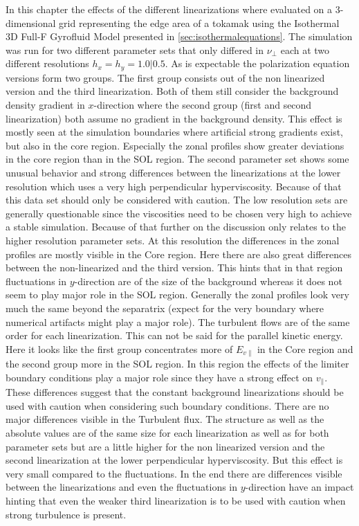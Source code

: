 \documentclass[master.tex]{subfiles}
\begin{document}
In this chapter the effects of the different linearizations where evaluated on a 3-dimensional grid representing the edge area of a tokamak using the Isothermal 3D Full-F Gyrofluid Model presented in \autoref{sec:isothermalequations}. The simulation was run for two different parameter sets that only differed in $\nu_\perp$ each at two different resolutions $h_x=h_y=1.0|0.5$.
As is expectable the polarization equation versions form two groups. The first group consists out of the non linearized version and the third linearization. Both of them still consider the background density gradient in $x$-direction where the second group (first and second linearization) both assume no gradient in the background density. This effect is mostly seen at the simulation boundaries where artificial strong gradients exist, but also in the core region. Especially the zonal profiles show greater deviations in the core region than in the SOL region.\newline
The second parameter set shows some unusual behavior and strong differences between the linearizations at the lower resolution which uses a very high perpendicular hyperviscosity. Because of that this data set should only be considered with caution.\newline
The low resolution sets are generally questionable since the viscosities need to be chosen very high to achieve a stable simulation. Because of that further on the discussion only relates to the higher resolution parameter sets.\newline
At this resolution the differences in the zonal profiles are mostly visible in the Core region. Here there are also great differences between the non-linearized and the third version. This hints that in that region fluctuations in $y$-direction are of the size of the background whereas it does not seem to play major role in the \ac{SOL} region. Generally the zonal profiles look very much the same beyond the separatrix (expect for the very boundary where numerical artifacts might play a major role). The turbulent flows are of the same order for each linearization. This can not be said for the parallel kinetic energy. Here it looks like the first group concentrates more of $E_{v\parallel}$ in the Core region and the second group more in the \ac{SOL} region. In this region the effects of the limiter boundary conditions play a major role since they have a strong effect on $v_{\parallel}$. These differences suggest that the constant background linearizations should be used with caution when considering such boundary conditions.\newline
There are no major differences visible in the Turbulent flux. The structure as well as the absolute values are of the same size for each linearization as well as for both parameter sets but are a little higher for the non linearized version and the second linearization at the lower perpendicular hyperviscosity. But this effect is very small compared to the fluctuations.\newline
In the end there are differences visible between the linearizations and even the fluctuations in $y$-direction have an impact hinting that even the weaker third linearization is to be used with caution when strong turbulence is present.
\end{document}
